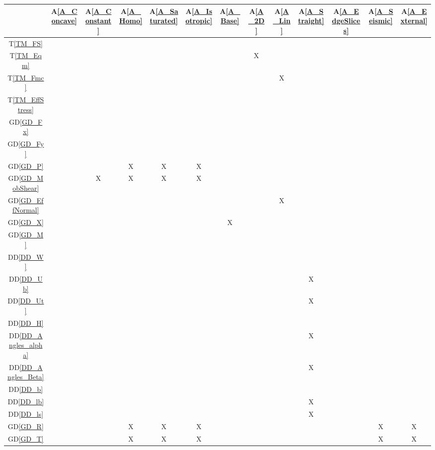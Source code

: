 \documentclass[12pt]{article}
\newcommand{\aref}[1]{A\ref{#1}}
\newcommand{\tref}[1]{T\ref{#1}}
\newcommand{\ddref}[1]{DD\ref{#1}}
\newcommand{\dref}[1]{GD\ref{#1}}
\begin{document}
\begin{table}[h!]
\centering
\begin{tabular}{|c|c|c|c|c|c|c|c|c|c|c|c|c|}
\hline
& \aref{A_Concave}& \aref{A_Constant}& \aref{A_Homo}& \aref{A_Saturated}&
\aref{A_Isotropic}& \aref{A_Base}& \aref{A_2D}& \aref{A_Lin}& 
\aref{A_Straight}& \aref{A_EdgeSlices}& \aref{A_Seismic}& \aref{A_External} \\
\hline
\tref{TM_FS}            & & & & & & & & & & & & \\ \hline
\tref{TM_Eqm}           & & & & & & & X& & & & & \\ \hline
\tref{TM_Fmc}           & & & & & & & & X& & & & \\ \hline
\tref{TM_EffStress}     & & & & & & & & & & & & \\ \hline
\dref{GD_Fx}            & & & & & & & & & & & & \\ \hline
\dref{GD_Fy}            & & & & & & & & & & & & \\ \hline
\dref{GD_P}             & & & X& X& X& & & & & & & \\ \hline
\dref{GD_MobShear}      & & X& X& X& X& & & & & & & \\ \hline
\dref{GD_EffNormal}     & & & & & & & & X& & & & \\ \hline
\dref{GD_X}             & & & & & & X& & & & & & \\ \hline
\dref{GD_M}             & & & & & & & & & & & & \\ \hline
\ddref{DD_W}            & & & & & & & & & & & & \\ \hline
\ddref{DD_Ub}           & & & & & & & & & X& & & \\ \hline
\ddref{DD_Ut}           & & & & & & & & & X& & & \\ \hline
\ddref{DD_H}            & & & & & & & & & & & & \\ \hline
\ddref{DD_Angles_alpha} & & & & & & & & & X& & & \\ \hline
\ddref{DD_Angles_Beta}  & & & & & & & & & X& & & \\ \hline
\ddref{DD_b}            & & & & & & & & & & & & \\ \hline
\ddref{DD_lb}           & & & & & & & & & X& & & \\ \hline
\ddref{DD_ls}           & & & & & & & & & X& & & \\ \hline
\dref{GD_R}            & & & X& X& X& & & & & & X& X\\ \hline
\dref{GD_T}            & & & X& X& X& & & & & & X& X\\ \hline

\end{tabular}
\end{table}
\end{document}

